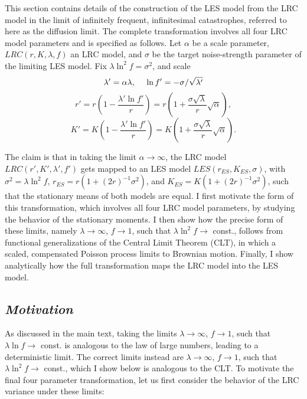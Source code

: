 This section contains details of the construction of the LES model from the LRC model in the limit of infinitely frequent, infinitesimal catastrophes, referred to here as the diffusion limit.  The complete transformation involves all four LRC model parameters and is specified as follows.  Let $\alpha$ be a scale parameter, $LRC(r,K,\lambda,f)$ an LRC model, and $\sigma$ be the target noise-strength parameter of the limiting LES model.  Fix $\lambda\ln^2 f = \sigma^2$, and scale
\begin{equation*}
\lambda' = \alpha \lambda,\text{\hspace{.4cm}}\ln f' = -\sigma/\sqrt{\lambda'}
\end{equation*}
\begin{equation*}
r' = r\left(1- \frac{\lambda'\ln f'}{r}\right) = r\left(1+ \frac{\sigma\sqrt{\lambda}}{r}\sqrt{\alpha}\right),
\end{equation*}
\begin{equation}
K' = K\left(1  -\frac{\lambda'\ln f'}{r}\right) = K\left(1+ \frac{\sigma\sqrt{\lambda}}{r}\sqrt{\alpha}\right).
\end{equation}


\noindent The claim is that in taking the limit $\alpha \to \infty$, the LRC model $LRC(r',K',\lambda',f')$ gets mapped to an LES model $LES(r_{ES},K_{ES},\sigma)$, with $\sigma^2 = \lambda\ln^2f$, $r_{ES} = r(1+(2r)^{-1}\sigma^2)$, and $K_{ES} = K(1+(2r)^{-1}\sigma^2)$, such that the stationary means of both models are equal. I first motivate the form of this transformation, which involves all four LRC model parameters, by studying the behavior of the stationary moments.  I then show how the precise form of these limits, namely $\lambda\to\infty$, $f\to 1$, such that $\lambda\ln^2f\to$ const., follows from functional generalizations of the Central Limit Theorem (CLT), in which a scaled, compensated Poisson process limits to Brownian motion.  Finally, I show analytically how the full transformation maps the LRC model into the LES model.  

\subsection*{\textit{Motivation}}

As discussed in the main text, taking the limits $\lambda\to\infty$, $f\to 1$, such that $\lambda\ln f\to$ const. is analogous to the law of large numbers, leading to a deterministic limit.  The correct limits instead are $\lambda\to\infty$, $f\to 1$, such that $\lambda\ln^2f\to$ const., which I show below is analogous to the CLT.  To motivate the final four parameter transformation, let us first consider the behavior of the LRC variance under these limits:

